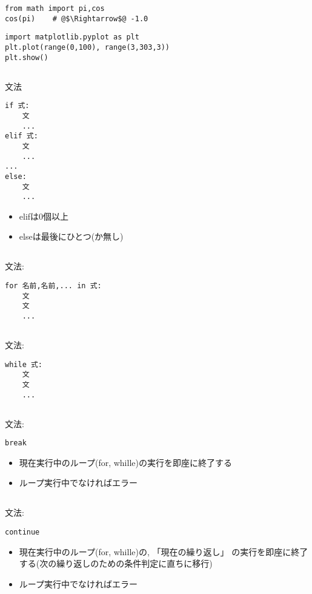 \documentclass[landscape,7pt,dvipdfmx]{article}
\newcommand{\ao}[1]{{\color{blue}{#1}}}
\begin{document}
\begin{multicols*}{3}
\begin{lstlisting}
from math import pi,cos
cos(pi)    # @$\Rightarrow$@ -1.0
\end{lstlisting}

\begin{lstlisting}
import matplotlib.pyplot as plt
plt.plot(range(0,100), range(3,303,3))
plt.show()
\end{lstlisting}

\subsection{\ao{if}}
文法

\begin{lstlisting}
if 式:
    文
    ...
elif 式:
    文
    ...
...
else:
    文
    ...
\end{lstlisting}
\begin{itemize}
\item elifは0個以上
\item elseは最後にひとつ(か無し)
\end{itemize}

\subsection{\ao{for}}
文法:
\begin{lstlisting}
for 名前,名前,... in 式:
    文
    文
    ...
\end{lstlisting}

\subsection{\ao{while}}
文法:
\begin{lstlisting}
while 式:
    文
    文
    ...
\end{lstlisting}

\subsection{\ao{break}}
文法:
\begin{lstlisting}
break
\end{lstlisting}
\begin{itemize}
\item 現在実行中のループ(for, whille)の実行を即座に終了する
\item ループ実行中でなければエラー
\end{itemize}

\subsection{\ao{continue}}
文法:
\begin{lstlisting}
continue
\end{lstlisting}
\begin{itemize}
\item 現在実行中のループ(for, whille)の, 「現在の繰り返し」
の実行を即座に終了する(次の繰り返しのための条件判定に直ちに移行)
\item ループ実行中でなければエラー
\end{itemize}


\end{multicols*}
\end{document}

